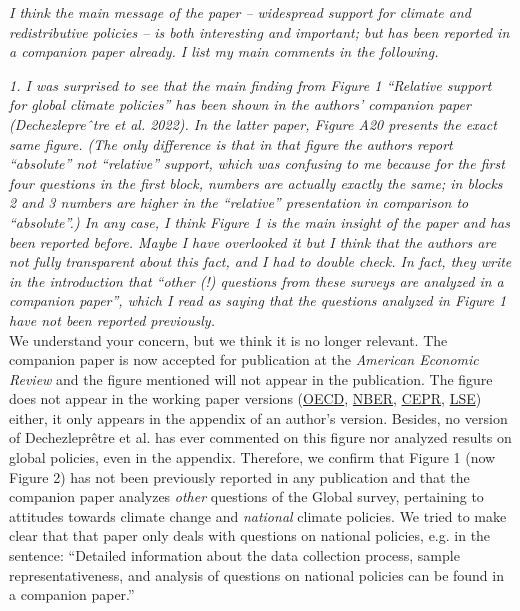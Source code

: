 \documentclass[12pt,english]{article}
\begin{document}
\textit{I think the main message of the paper – widespread support for climate and redistributive policies – is both interesting and important; but has been reported in a companion paper already. I list my main comments in the following.}

\textit{1. I was surprised to see that the main finding from Figure 1 “Relative support for global climate policies” has been shown in the authors’ companion paper (Dechezlepreˆtre et al. 2022). In the latter paper, Figure A20 presents the exact same figure. (The only difference is that in that figure the authors report “absolute” not “relative” support, which was confusing to me because for the first four questions in the first block, numbers are actually exactly the same; in blocks 2 and 3 numbers are higher in the “relative” presentation in comparison to “absolute”.) In any case, I think Figure 1 is the main insight of the paper and has been reported before. Maybe I have overlooked it but I think that the authors are not fully transparent about this fact, and I had to double check. In fact, they write in the introduction that “other (!) questions from these surveys are analyzed in a companion paper”, which I read as saying that the questions analyzed in Figure 1 have not been reported previously.}~\\

We understand your concern, but we think it is no longer relevant. The companion paper is now accepted for publication at the \textit{American Economic Review} and the figure mentioned will not appear in the publication. The figure does not appear in the working paper versions (\href{https://www.oecd.org/climate-change/international-attitudes-toward-climate-policies/}{OECD}, \href{https://data.nber.org/data-appendix/w30265/International_Attitudes_Toward_Climate_Change_OA.pdf}{NBER}, \href{https://repec.cepr.org/repec/cpr/ceprdp/DP17602.pdf}{CEPR}, \href{https://www.lse.ac.uk/granthaminstitute/wp-content/uploads/2022/12/working-paper-384-Dechezlepretre-et-al.pdf}{LSE}) either, it only appears in the appendix of an author's version. Besides, no version of Dechezleprêtre et al. has ever commented on this figure nor analyzed results on global policies, even in the appendix. Therefore, we confirm that Figure 1 (now Figure 2) has not been previously reported in any publication and that the companion paper analyzes \textit{other} questions of the Global survey, pertaining to attitudes towards climate change and \textit{national} climate policies. We tried to make clear that that paper only deals with questions on national policies, e.g. in the sentence: ``Detailed information about the data collection process, sample representativeness, and analysis of questions on national policies can be found in a companion paper.''
\end{document}
